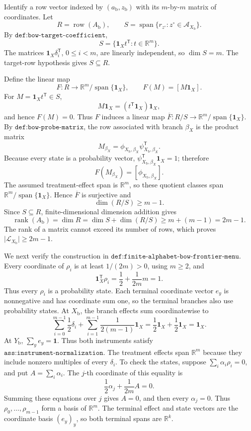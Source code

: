Identify a row vector indexed by \((a_{\mathrm b},z_{\mathrm b})\) with its \(m\)-by-\(m\) matrix of coordinates.  Let
\[
R=\operatorname{row}(A_{\mathrm b}),
\qquad
S=\operatorname{span}\{r_{z^{\circ}}:z^{\circ}\in\mathcal A_{X_{\mathrm b}}\}.
\]
By \(\texttt{def:bow-target-coefficient}\),
\[
S=\{\mathbf 1_X t^{\mathsf T}:t\in\mathbb R^m\}.
\]
The matrices \(\mathbf 1_X\delta_i^{\mathsf T}\), \(0\le i<m\), are linearly independent, so \(\dim S=m\).  The target-row hypothesis gives \(S\subseteq R\).

Define the linear map
\[
F:R\longrightarrow\mathbb R^m/\operatorname{span}\{\mathbf 1_X\},
\qquad
F(M)=[M\mathbf 1_X].
\]
For \(M=\mathbf 1_Xt^{\mathsf T}\in S\),
\[
M\mathbf 1_X=(t^{\mathsf T}\mathbf 1_X)\mathbf 1_X,
\]
and hence \(F(M)=0\).  Thus \(F\) induces a linear map \(\overline F:R/S\to\mathbb R^m/\operatorname{span}\{\mathbf 1_X\}\).  By \(\texttt{def:bow-probe-matrix}\), the row associated with branch \(\beta_X\) is the product matrix
\[
M_{\beta_X}=\phi_{X_{\mathrm b},\beta_X}\psi_{X_{\mathrm b},\beta_X}^{\mathsf T}.
\]
Because every state is a probability vector, \(\psi_{X_{\mathrm b},\beta_X}^{\mathsf T}\mathbf 1_X=1\); therefore
\[
F(M_{\beta_X})=[\phi_{X_{\mathrm b},\beta_X}].
\]
The assumed treatment-effect span is \(\mathbb R^m\), so these quotient classes span \(\mathbb R^m/\operatorname{span}\{\mathbf 1_X\}\).  Hence \(\overline F\) is surjective and
\[
\dim(R/S)\ge m-1.
\]
Since \(S\subseteq R\), finite-dimensional dimension addition gives
\[
\operatorname{rank}(A_{\mathrm b})=\dim R
=\dim S+\dim(R/S)
\ge m+(m-1)=2m-1.
\]
The rank of a matrix cannot exceed its number of rows, which proves \(\lvert\mathcal L_{X_{\mathrm b}}\rvert\ge2m-1\).

We next verify the construction in \(\texttt{def:finite-alphabet-bow-frontier-menu}\).  Every coordinate of \(\rho_i\) is at least \(1/(2m)>0\), using \(m\ge2\), and
\[
\mathbf 1_X^{\mathsf T}\rho_i=\frac12+\frac1{2m}m=1.
\]
Thus every \(\rho_i\) is a probability state.  Each terminal coordinate vector \(e_y\) is nonnegative and has coordinate sum one, so the terminal branches also use probability states.  At \(X_{\mathrm b}\), the branch effects sum coordinatewise to
\[
\sum_{i=0}^{m-1}\frac12\delta_i
+\sum_{i=1}^{m-1}\frac1{2(m-1)}\mathbf 1_X
=\frac12\mathbf 1_X+\frac12\mathbf 1_X
=\mathbf 1_X.
\]
At \(Y_{\mathrm b}\), \(\sum_y e_y=\mathbf 1\).  Thus both instruments satisfy \(\texttt{ass:instrument-normalization}\).  The treatment effects span \(\mathbb R^m\) because they include nonzero multiples of every \(\delta_i\).  To check the states, suppose \(\sum_i\alpha_i\rho_i=0\), and put \(A=\sum_i\alpha_i\).  The \(j\)-th coordinate of this equality is
\[
\frac12\alpha_j+\frac1{2m}A=0.
\]
Summing these equations over \(j\) gives \(A=0\), and then every \(\alpha_j=0\).  Thus \(\rho_0,\ldots,\rho_{m-1}\) form a basis of \(\mathbb R^m\).  The terminal effect and state vectors are the coordinate basis \((e_y)_y\), so both terminal spans are \(\mathbb R^k\).

